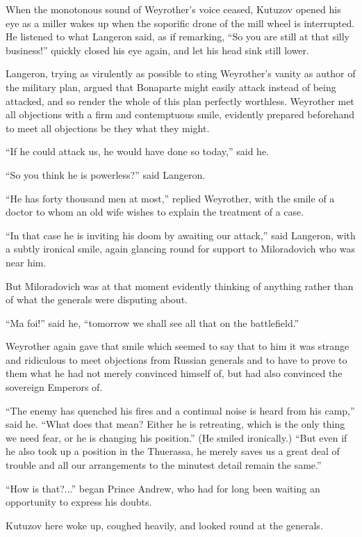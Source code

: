 When the monotonous sound of Weyrother's voice ceased, Kutuzov
opened his eye as a miller wakes up when the soporific drone of
the mill wheel is interrupted. He listened to what Langeron said,
as if remarking, ``So you are still at that silly business!''
quickly closed his eye again, and let his head sink still lower.

Langeron, trying as virulently as possible to sting Weyrother's
vanity as author of the military plan, argued that Bonaparte
might easily attack instead of being attacked, and so render the
whole of this plan perfectly worthless. Weyrother met all
objections with a firm and contemptuous smile, evidently prepared
beforehand to meet all objections be they what they might.

``If he could attack us, he would have done so today,'' said he.

``So you think he is powerless?'' said Langeron.

``He has forty thousand men at most,'' replied Weyrother, with
the smile of a doctor to whom an old wife wishes to explain the
treatment of a case.

``In that case he is inviting his doom by awaiting our attack,''
said Langeron, with a subtly ironical smile, again glancing round
for support to Miloradovich who was near him.

But Miloradovich was at that moment evidently thinking of
anything rather than of what the generals were disputing about.

``Ma foi!'' said he, ``tomorrow we shall see all that on the
battlefield.''

Weyrother again gave that smile which seemed to say that to him
it was strange and ridiculous to meet objections from Russian
generals and to have to prove to them what he had not merely
convinced himself of, but had also convinced the sovereign
Emperors of.

``The enemy has quenched his fires and a continual noise is heard
from his camp,'' said he. ``What does that mean? Either he is
retreating, which is the only thing we need fear, or he is
changing his position.'' (He smiled ironically.) ``But even if he
also took up a position in the Thuerassa, he merely saves us a
great deal of trouble and all our arrangements to the minutest
detail remain the same.''

``How is that?...'' began Prince Andrew, who had for long been
waiting an opportunity to express his doubts.

Kutuzov here woke up, coughed heavily, and looked round at the
generals.

